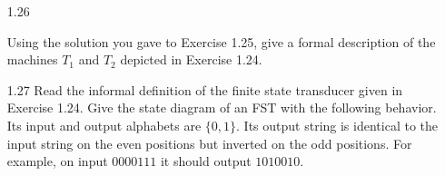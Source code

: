 \begin{enumerate}

    \item [1.26]

          Using the solution you gave to Exercise 1.25, give a formal description of the machines $T_1$ and $T_2$ depicted in Exercise 1.24.

    \item [1.27]
          Read the informal definition of the finite state transducer given in Exercise 1.24. Give the state diagram of an FST with the following behavior. Its input and output alphabets are $\{0,1\}$. Its output string is identical to the input string on the even positions but inverted on the odd positions. For example, on input $0000111$ it should output $1010010$.

          \begin{figure}[H]
              \centering
          \end{figure}


\end{enumerate}
